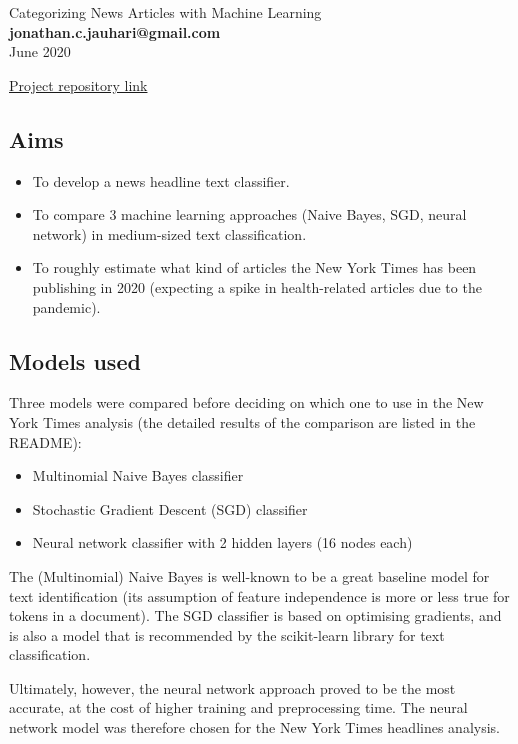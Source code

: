 \documentclass[11pt]{article}
\begin{document}
\Large{Categorizing News Articles with Machine Learning} \\[2mm]
\large\textbf{jonathan.c.jauhari@gmail.com} \\[2mm]
\large{June 2020}

\href{https://github.com/jonjau/msa-ml-project}{Project repository link}

\subsection*{Aims}

\begin{itemize}
    \item To develop a news headline text classifier.
    \item To compare 3 machine learning approaches (Naive Bayes, SGD, neural 
          network) in medium-sized text classification.
    \item To roughly estimate what kind of articles the New York Times has been
          publishing in 2020 (expecting a spike in health-related articles
          due to the pandemic).
\end{itemize}


\subsection*{Models used}

Three models were compared before deciding on which one to use in the New
York Times analysis (the detailed results of the comparison are listed in the
README):

\begin{itemize}
    \item Multinomial Naive Bayes classifier
    \item Stochastic Gradient Descent (SGD) classifier
    \item Neural network classifier with 2 hidden layers (16 nodes each)
\end{itemize}

The (Multinomial) Naive Bayes is well-known to be a great baseline model for
text identification (its assumption of feature independence is more or less
true for tokens in a document). The SGD classifier is based on
optimising gradients, and is also a model that is recommended by the
scikit-learn library for text classification.

Ultimately, however, the neural network approach proved to be the most
accurate, at the cost of higher training and preprocessing time. The neural
network model was therefore chosen for the New York Times headlines analysis.
\end{document}
